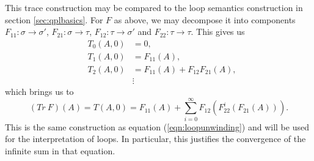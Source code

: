 This trace construction may be compared to the loop semantics construction in section
\ref{sec:qplbasics}. For $F$ as above, we may decompose it into components
$F_{11}:\sigma\to\sigma'$, $F_{21}:\sigma\to\tau$, $F_{12}:\tau\to\sigma'$ and
$F_{22}:\tau\to\tau$. This gives us
\begin{eqnarray*}
  &T_{0}(A,0) &= 0,\\
  &T_{1}(A,0) &= F_{11}(A),\\
  &T_{2}(A,0) &= F_{11}(A) + F_{12}F_{21}(A),\\
  &&\vdots
\end{eqnarray*}
which brings us to
\begin{equation*}
  (Tr\ F)(A) = T(A,0) = F_{11}(A) +\sum_{i=0}^{\infty}F_{12}(F_{22}^{i}(F_{21}(A))).
\end{equation*}
This is the same construction as equation (\ref{eqn:loopunwinding}) and will be used for the
interpretation of loops. In particular, this justifies the convergence of the infinite sum in that
equation.

